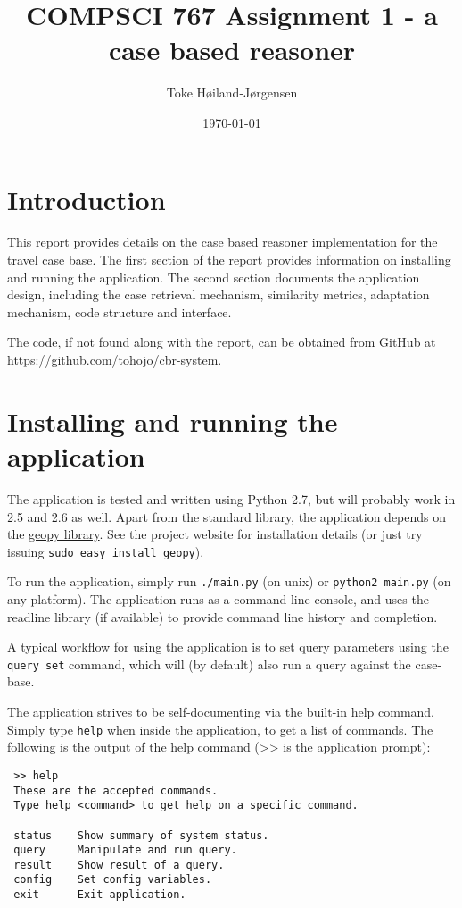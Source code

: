 \documentclass[11pt]{article}
\title{COMPSCI 767 Assignment 1 - a case based reasoner}
\author{Toke Høiland-Jørgensen}
\date{\today}
\begin{document}
\maketitle

\setcounter{tocdepth}{3}
\tableofcontents
\vspace*{1cm}

\section{Introduction}
This report provides details on the case based reasoner implementation
for the travel case base. The first section of the report provides
information on installing and running the application. The second
section documents the application design, including the case retrieval
mechanism, similarity metrics, adaptation mechanism, code structure
and interface.

The code, if not found along with the report, can be obtained from
GitHub at \url{https://github.com/tohojo/cbr-system}.

\section{Installing and running the application}
The application is tested and written using Python 2.7, but will
probably work in 2.5 and 2.6 as well. Apart from the standard library,
the application depends on the
\href{http://code.google.com/p/geopy/}{geopy library}. See the project
website for installation details (or just try issuing \texttt{sudo
  easy\_install geopy}).

To run the application, simply run \texttt{./main.py} (on unix) or
\texttt{python2 main.py} (on any platform). The application runs as a
command-line console, and uses the readline library (if available) to
provide command line history and completion.

A typical workflow for using the application is to set query
parameters using the \verb~query set~ command, which will (by default)
also run a query against the case-base.

The application strives to be self-documenting via the built-in help
command. Simply type \verb~help~ when inside the application, to get a
list of commands. The following is the output of the help command (>>
is the application prompt):

\begin{verbatim}
 >> help
 These are the accepted commands.
 Type help <command> to get help on a specific command.

 status    Show summary of system status.
 query     Manipulate and run query.
 result    Show result of a query.
 config    Set config variables.
 exit      Exit application.
\end{verbatim}
\end{document}
